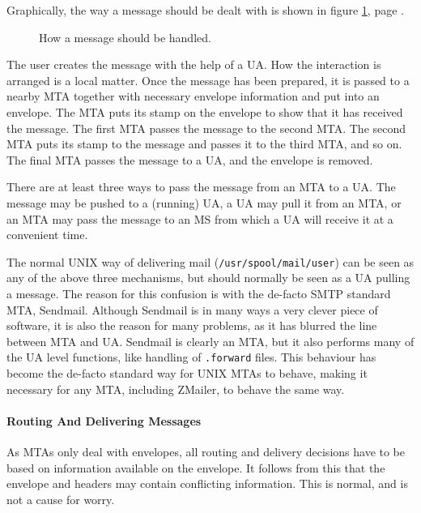 Graphically, the way a message should be dealt with is shown 
in figure
 \ref{fig:msgrout}, page \pageref{fig:msgrout}.
\begin{figure}[ht]
  \centering
  \caption{\label{fig:msgrout}How a message should be handled.}
\end{figure}

The user creates the message with the help of a UA. How the interaction 
is arranged is a local matter. Once the message has been prepared, 
it is passed to a nearby MTA together with necessary envelope 
information and put into an envelope. The MTA puts its stamp on 
the envelope to show that it has received the message. The first 
MTA passes the message to the second MTA. The second MTA puts its 
stamp to the message and passes it to the third MTA, and so on. 
The final MTA passes the message to a UA, and the envelope is removed.

There are at least three ways to pass the message from an MTA to a UA. 
The message may be pushed to a (running) UA, a UA may pull it from an MTA, 
or an MTA may pass the message to an MS from which a UA will receive it at 
a convenient time.

The normal UNIX way of delivering mail ({\tt /usr/spool/mail/user}) can be 
seen as any of the above three mechanisms, but should normally be seen as a 
UA pulling a message. The reason for this confusion is with the de-facto SMTP 
standard MTA, Sendmail. Although Sendmail is in many ways a very clever 
piece of software, it is also the reason for many problems, as it has 
blurred the line between MTA and UA. Sendmail is clearly an MTA, but 
it also performs many of the UA level functions, like handling of 
{\tt .forward} files. This behaviour has become the de-facto standard 
way for UNIX MTAs to behave, making it necessary for any MTA, including
ZMailer, to behave the same way.



\paragraph{Routing And Delivering Messages}



As MTAs only deal with envelopes, all routing and delivery decisions have to be
based on information available on the envelope. It follows from this that 
the envelope and headers may contain conflicting information. This is normal, 
and is not a cause for worry.

